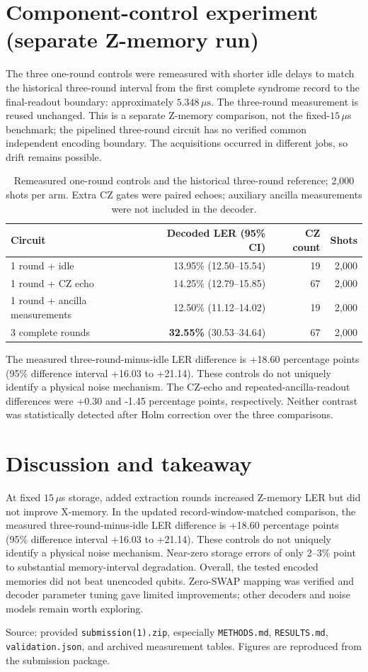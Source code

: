 \documentclass[9pt,letterpaper]{article}
\begin{document}
\section*{Component-control experiment (separate Z-memory run)}
The three one-round controls were remeasured with shorter idle delays to match the historical three-round interval from the first complete syndrome record to the final-readout boundary: approximately $5.348\,\mu\mathrm{s}$. The three-round measurement is reused unchanged. This is a separate Z-memory comparison, not the fixed-$15\,\mu$s benchmark; the pipelined three-round circuit has no verified common independent encoding boundary. The acquisitions occurred in different jobs, so drift remains possible.
\begin{table}[h]
\centering\small
\begin{tabular}{lrrr}
\toprule
\textbf{Circuit} & \textbf{Decoded LER (95\% CI)} & \textbf{CZ count} & \textbf{Shots}\\
\midrule
1 round + idle & 13.95\% (12.50--15.54) & 19 & 2,000\\
1 round + CZ echo & 14.25\% (12.79--15.85) & 67 & 2,000\\
1 round + ancilla measurements & 12.50\% (11.12--14.02) & 19 & 2,000\\
3 complete rounds & \textbf{32.55\%} (30.53--34.64) & 67 & 2,000\\
\bottomrule
\end{tabular}
\caption{Remeasured one-round controls and the historical three-round reference; 2,000 shots per arm. Extra CZ gates were paired echoes; auxiliary ancilla measurements were not included in the decoder.}
\end{table}
The measured three-round-minus-idle LER difference is +18.60 percentage points (95\% difference interval +16.03 to +21.14). These controls do not uniquely identify a physical noise mechanism. The CZ-echo and repeated-ancilla-readout differences were +0.30 and -1.45 percentage points, respectively. Neither contrast was statistically detected after Holm correction over the three comparisons.

\section*{Discussion and takeaway}
At fixed $15\,\mu$s storage, added extraction rounds increased Z-memory LER but did not improve X-memory. In the updated record-window-matched comparison, the measured three-round-minus-idle LER difference is +18.60 percentage points (95\% difference interval +16.03 to +21.14). These controls do not uniquely identify a physical noise mechanism. Near-zero storage errors of only 2--3\% point to substantial memory-interval degradation. Overall, the tested encoded memories did not beat unencoded qubits. Zero-SWAP mapping was verified and decoder parameter tuning gave limited improvements; other decoders and noise models remain worth exploring.

\vfill
{\footnotesize\color{gray}Source: provided \texttt{submission(1).zip}, especially \texttt{METHODS.md}, \texttt{RESULTS.md}, \texttt{validation.json}, and archived measurement tables. Figures are reproduced from the submission package.}
\end{document}
